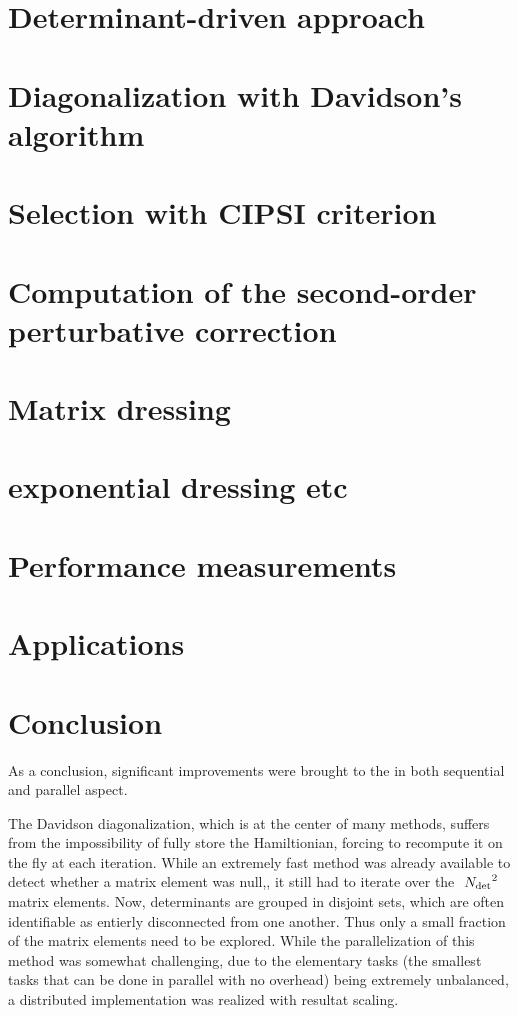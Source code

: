 \documentclass[12pt,a4paper]{report}
\begin{document}
\chapter{Determinant-driven approach}
\minitoc


\chapter{Diagonalization with Davidson's algorithm}
\minitoc


\chapter{Selection with CIPSI criterion}
\minitoc


\chapter{Computation of the second-order perturbative correction}
\minitoc


\chapter{Matrix dressing}
\minitoc


\chapter{exponential dressing etc}
\minitoc


\chapter{Performance measurements}
\minitoc


\chapter{Applications}
\minitoc


\chapter{Conclusion}

As a conclusion, significant improvements were brought to the \QP in both sequential and parallel aspect.

The Davidson diagonalization, which is at the center of many methods, suffers from the impossibility of fully store the Hamiltionian, forcing to recompute it on the fly at each iteration. While an extremely fast method was already available to detect whether a matrix element was null,\cite{scemama_2013}, it still had to iterate over the $~{N_\text{det}}^2$ matrix elements. Now, determinants are grouped in disjoint sets, which are often identifiable as entierly disconnected from one another. Thus only a small fraction of the matrix elements need to be explored.
While the parallelization of this method was somewhat challenging, due to the elementary tasks (the smallest tasks that can be done in parallel with no overhead) being extremely unbalanced, a distributed implementation was realized with \alert{resultat scaling}.
\end{document}
